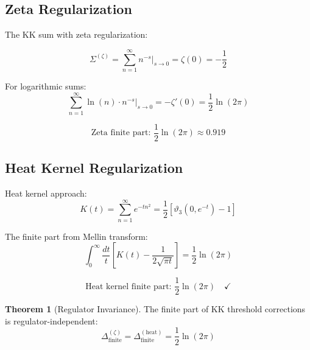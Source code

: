 \documentclass[11pt,a4paper]{article}
\theoremstyle{definition}
\newtheorem{theorem}{Theorem}[section]
\begin{document}
\subsection{Zeta Regularization}
\label{subsec:zeta_reg}

The KK sum with zeta regularization:

\begin{equation}
\label{eq:zeta_sum}
\Sigma^{(\zeta)} = \sum_{n=1}^{\infty} n^{-s} \Big|_{s \to 0} = \zeta(0) = -\frac{1}{2}
\end{equation}

For logarithmic sums:
\begin{equation}
\label{eq:zeta_log_sum}
\sum_{n=1}^{\infty} \ln(n) \cdot n^{-s} \Big|_{s \to 0} = -\zeta'(0) = \frac{1}{2}\ln(2\pi)
\end{equation}

\begin{equation}
\label{eq:zeta_result}
\text{Zeta finite part: } \frac{1}{2}\ln(2\pi) \approx 0.919
\end{equation}

\subsection{Heat Kernel Regularization}
\label{subsec:heat_kernel}

Heat kernel approach:
\begin{equation}
\label{eq:heat_kernel}
K(t) = \sum_{n=1}^{\infty} e^{-t n^2} = \frac{1}{2}\left[\vartheta_3(0, e^{-t}) - 1\right]
\end{equation}

The finite part from Mellin transform:
\begin{equation}
\label{eq:heat_finite}
\int_0^{\infty} \frac{dt}{t} \left[K(t) - \frac{1}{2\sqrt{\pi t}}\right] = \frac{1}{2}\ln(2\pi)
\end{equation}

\begin{equation}
\label{eq:heat_check}
\text{Heat kernel finite part: } \frac{1}{2}\ln(2\pi) \quad \checkmark
\end{equation}

\begin{theorem}[Regulator Invariance]
\label{thm:reg_invariance}
The finite part of KK threshold corrections is regulator-independent:
\begin{equation}
\label{eq:reg_inv_result}
\Delta^{(\zeta)}_{\text{finite}} = \Delta^{(\text{heat})}_{\text{finite}} = \frac{1}{2}\ln(2\pi)
\end{equation}
\end{theorem}
\end{document}
